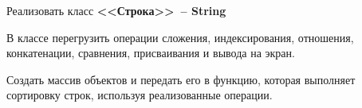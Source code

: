 Реализовать класс \textbf{<<Строка>>~-- String}

В классе перегрузить операции сложения, индексирования, отношения,
конкатенации, сравнения, присваивания и вывода на экран.

Создать массив объектов и
передать его в функцию, которая выполняет сортировку строк, используя реализованные
операции.


